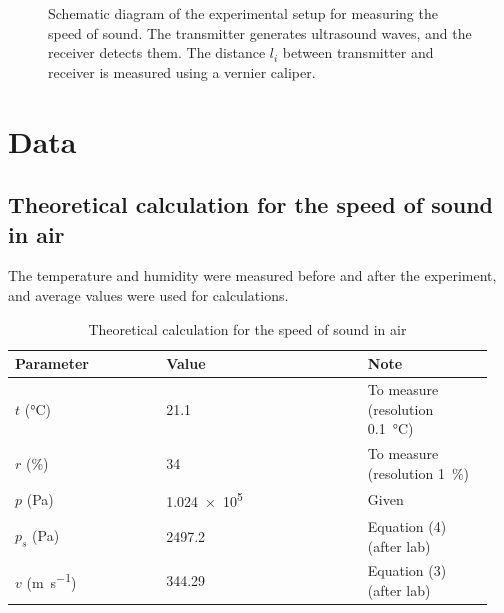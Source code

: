 \documentclass[12pt]{article}
\begin{document}
\begin{figure}[ht]
\centering
{}
\caption{Schematic diagram of the experimental setup for measuring the speed of sound. The transmitter generates ultrasound waves, and the receiver detects them. The distance $l_i$ between transmitter and receiver is measured using a vernier caliper.}
\end{figure}

\section{Data}

\subsection{Theoretical calculation for the speed of sound in air}

The temperature and humidity were measured before and after the experiment, and average values were used for calculations.

\begin{table}[ht]
\centering
\caption{Theoretical calculation for the speed of sound in air}
\begin{tabular}{@{}p{0.3\linewidth}p{0.4\linewidth}p{0.25\linewidth}@{}}
\toprule
\textbf{Parameter} & \textbf{Value} & \textbf{Note} \\
\midrule
$t$ (\si{\celsius}) & 21.1 & To measure (resolution \SI{0.1}{\celsius}) \\
$r$ (\%) & 34 & To measure (resolution \SI{1}{\percent}) \\
$p$ (\si{\pascal}) & \num{1.024e5} & Given \\
$p_s$ (\si{\pascal}) & 2497.2 & Equation (4) (after lab) \\
$v$ (\si{\meter\per\second}) & 344.29 & Equation (3) (after lab) \\
\bottomrule
\end{tabular}
\end{table}
\end{document}
